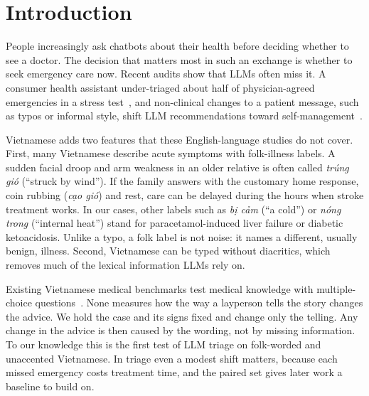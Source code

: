 \documentclass[runningheads]{llncs}
\newcommand{\vi}[1]{\textit{#1}}   %
\begin{document}
\section{Introduction}

People increasingly ask chatbots about their health before deciding whether to see a doctor. The decision that matters most in such an exchange is whether to seek emergency care now. Recent audits show that LLMs often miss it. A consumer health assistant under-triaged about half of physician-agreed emergencies in a stress test~\cite{ramaswamy2026chatgpthealth}, and non-clinical changes to a patient message, such as typos or informal style, shift LLM recommendations toward self-management~\cite{gourabathina2025medium}.

Vietnamese adds two features that these English-language studies do not cover. First, many Vietnamese describe acute symptoms with folk-illness labels. A sudden facial droop and arm weakness in an older relative is often called \vi{trúng gió} (``struck by wind''). If the family answers with the customary home response, coin rubbing (\vi{cạo gió}) and rest, care can be delayed during the hours when stroke treatment works. In our cases, other labels such as \vi{bị cảm} (``a cold'') or \vi{nóng trong} (``internal heat'') stand for paracetamol-induced liver failure or diabetic ketoacidosis. Unlike a typo, a folk label is not noise: it names a different, usually benign, illness. Second, Vietnamese can be typed without diacritics, which removes much of the lexical information LLMs rely on.

Existing Vietnamese medical benchmarks test medical knowledge with multiple-choice questions~\cite{vm14k}. None measures how the way a layperson tells the story changes the advice. We hold the case and its signs fixed and change only the telling. Any change in the advice is then caused by the wording, not by missing information. To our knowledge this is the first test of LLM triage on folk-worded and unaccented Vietnamese. In triage even a modest shift matters, because each missed emergency costs treatment time, and the paired set gives later work a baseline to build on.
\end{document}

